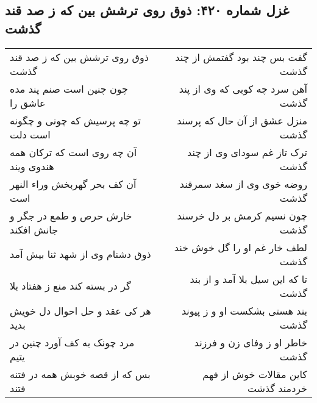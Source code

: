 \begin{center}
\section*{غزل شماره ۴۲۰: ذوق روی ترشش بین که ز صد قند گذشت}
\label{sec:0420}
\begin{longtable}{l p{0.5cm} r}
ذوق روی ترشش بین که ز صد قند گذشت
&&
گفت بس چند بود گفتمش از چند گذشت
\\
چون چنین است صنم پند مده عاشق را
&&
آهن سرد چه کوبی که وی از پند گذشت
\\
تو چه پرسیش که چونی و چگونه است دلت
&&
منزل عشق از آن حال که پرسند گذشت
\\
آن چه روی است که ترکان همه هندوی ویند
&&
ترک تاز غم سودای وی از چند گذشت
\\
آن کف بحر گهربخش وراء النهر است
&&
روضه خوی وی از سغد سمرقند گذشت
\\
خارش حرص و طمع در جگر و جانش افکند
&&
چون نسیم کرمش بر دل خرسند گذشت
\\
ذوق دشنام وی از شهد ثنا بیش آمد
&&
لطف خار غم او را گل خوش خند گذشت
\\
گر در بسته کند منع ز هفتاد بلا
&&
تا که این سیل بلا آمد و از بند گذشت
\\
هر کی عقد و حل احوال دل خویش بدید
&&
بند هستی بشکست او و ز پیوند گذشت
\\
مرد چونک به کف آورد چنین در یتیم
&&
خاطر او ز وفای زن و فرزند گذشت
\\
بس که از قصه خوبش همه در فتنه فتند
&&
کاین مقالات خوش از فهم خردمند گذشت
\\
\end{longtable}
\end{center}
